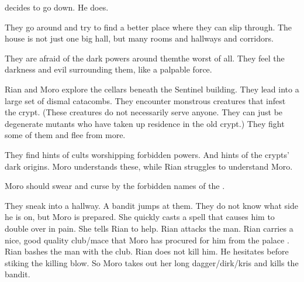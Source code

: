 \Psyrex decides to go down.
He does. 





\begin{comment}
  \section{Moro and Rian attack}
\end{comment}
\new
\begin{comment}
  \subsection{Looking around}
\end{comment}
They go around and try to find a better place where they can slip through.
The house is not just one big hall, but many rooms and hallways and corridors. 

They are afraid of the dark powers around them\dash the \banes{} worst of all. 
They feel the darkness and evil surrounding them, like a palpable force. 


Rian and Moro \Cornel{} explore the cellars beneath the Sentinel building.
They lead into a large set of dismal catacombs.  
They encounter monstrous creatures that infest the crypt. 
(These creatures do not necessarily serve anyone. They can just be degenerate mutants who have taken up residence in the old crypt.) 
They fight some of them and flee from more. 

They find hints of cults worshipping forbidden powers. And hints of the crypts' dark origins. Moro understands these, while Rian struggles to understand Moro. 

Moro should swear and curse by the forbidden names of the \xss.


They sneak into a hallway.
A bandit jumps at them.
They do not know what side he is on, but Moro is prepared. 
She quickly casts a spell that causes him to double over in pain.
She tells Rian to help.
Rian attacks the man.
Rian carries a nice, good quality club/mace that Moro has procured for him from the palace \armoury.
Rian bashes the man with the club. 
Rian does not kill him.
He hesitates before stiking the killing blow. 
So Moro takes out her long dagger/dirk/kris and kills the bandit. 

